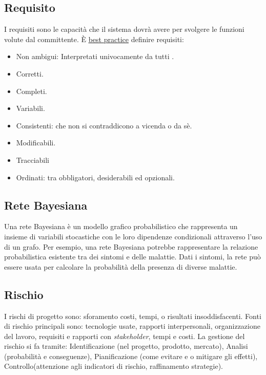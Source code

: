 	\subsection{Requisito}
	\label{sec:requisito}
	I requisiti sono le capacità che il sistema dovrà avere per svolgere le funzioni volute dal committente. È \underline{\hyperref[sec:bestpractice]{best practice}} definire requisiti:
	\begin{itemize}
	\item Non ambigui: Interpretati univocamente da tutti .
	\item Corretti.
	\item Completi.
	\item Variabili.
	\item Consistenti: che non si contraddicono a vicenda o da sè.
	\item Modificabili.
	\item Tracciabili
	\item Ordinati: tra obbligatori, desiderabili ed opzionali.
	\end{itemize}

	\subsection{Rete Bayesiana}
	\label{sec:retebayes}
	Una rete Bayesiana è un modello grafico probabilistico che rappresenta un insieme di variabili stocastiche con le loro dipendenze condizionali attraverso l'uso di un grafo. Per esempio, una rete Bayesiana potrebbe rappresentare la relazione probabilistica esistente tra dei sintomi e delle malattie. Dati i sintomi, la rete può essere usata per calcolare la probabilità della presenza di diverse malattie.

	\subsection{Rischio}
	\label{sec:rischio}
	I rischi di progetto sono: sforamento costi, tempi, o risultati insoddisfacenti. Fonti di rischio principali sono:
	tecnologie usate, rapporti interpersonali, organizzazione del lavoro, requisiti e rapporti con  \emph{stakeholder}, tempi e costi.
	La gestione del rischio si fa tramite:
	Identificazione (nel progetto, prodotto, mercato), Analisi (probabilità e conseguenze), Pianificazione (come evitare e o mitigare gli effetti), Controllo(attenzione agli indicatori di rischio, raffinamento strategie).


